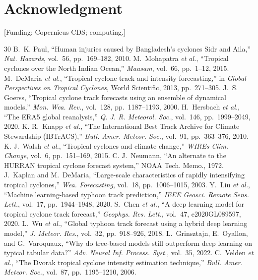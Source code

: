 \documentclass[conference]{IEEEtran}
\begin{document}
\section*{Acknowledgment}
[Funding; Copernicus CDS; computing.]

\begin{thebibliography}{30}
B.~K. Paul, ``Human injuries caused by Bangladesh's cyclones Sidr and Aila,'' \textit{Nat. Hazards}, vol.~56, pp.~169--182, 2010.
M.~Mohapatra \textit{et al.}, ``Tropical cyclones over the North Indian Ocean,'' \textit{Mausam}, vol.~66, pp.~1--12, 2015.
M.~DeMaria \textit{et al.}, ``Tropical cyclone track and intensity forecasting,'' in \textit{Global Perspectives on Tropical Cyclones}, World Scientific, 2013, pp.~271--305.
J.~S. Goerss, ``Tropical cyclone track forecasts using an ensemble of dynamical models,'' \textit{Mon. Wea. Rev.}, vol.~128, pp.~1187--1193, 2000.
H.~Hersbach \textit{et al.}, ``The ERA5 global reanalysis,'' \textit{Q. J. R. Meteorol. Soc.}, vol.~146, pp.~1999--2049, 2020.
K. R.~Knapp \textit{et al.}, ``The International Best Track Archive for Climate Stewardship (IBTrACS),'' \textit{Bull. Amer. Meteor. Soc.}, vol.~91, pp.~363--376, 2010.
K. J.~Walsh \textit{et al.}, ``Tropical cyclones and climate change,'' \textit{WIREs Clim. Change}, vol.~6, pp.~151--169, 2015.
C. J.~Neumann, ``An alternate to the HURRAN tropical cyclone forecast system,'' NOAA Tech. Memo., 1972.
J.~Kaplan and M.~DeMaria, ``Large-scale characteristics of rapidly intensifying tropical cyclones,'' \textit{Wea. Forecasting}, vol.~18, pp.~1006--1015, 2003.
Y.~Liu \textit{et al.}, ``Machine learning-based typhoon track prediction,'' \textit{IEEE Geosci. Remote Sens. Lett.}, vol.~17, pp.~1944--1948, 2020.
S.~Chen \textit{et al.}, ``A deep learning model for tropical cyclone track forecast,'' \textit{Geophys. Res. Lett.}, vol.~47, e2020GL089597, 2020.
L.~Wu \textit{et al.}, ``Global typhoon track forecast using a hybrid deep learning model,'' \textit{J. Meteor. Res.}, vol.~32, pp.~918--926, 2018.
L.~Grinsztajn, E.~Oyallon, and G.~Varoquaux, ``Why do tree-based models still outperform deep learning on typical tabular data?'' \textit{Adv. Neural Inf. Process. Syst.}, vol.~35, 2022.
C.~Velden \textit{et al.}, ``The Dvorak tropical cyclone intensity estimation technique,'' \textit{Bull. Amer. Meteor. Soc.}, vol.~87, pp.~1195--1210, 2006.

\end{thebibliography}
\end{document}
